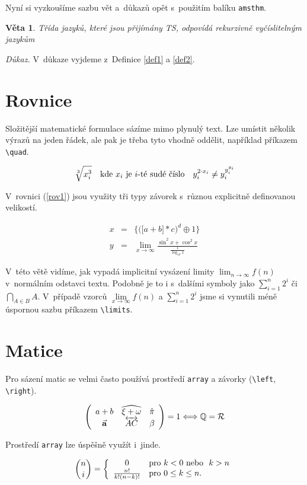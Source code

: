 \documentclass[a4paper,11pt,twocolumn]{article}
\newtheorem{veta}{Věta}
\begin{document}
Nyní si vyzkoušíme sazbu vět a~důkazů opět s~použitím
balíku \verb|amsthm|.

\begin{veta}
    Třída jazyků, které jsou přijímány TS, odpovídá rekurzivně vyčíslitelným jazykům
\end{veta}

\noindent\textit{Důkaz.}  V~důkaze vyjdeme z~Definice \ref{def1} a \ref{def2}.

\section{Rovnice}
Složitější matematické formulace sázíme mimo plynulý
text. Lze umístit několik výrazů na jeden řádek, ale pak je
třeba tyto vhodně oddělit, například příkazem \verb|\quad|.

$$\sqrt[3]{x^3_i} \quad \textnormal{kde}\ x_i\ \textnormal{je}\ i \textnormal{-té sudé číslo}\quad y^{2\cdot x_i}_i \neq y^{y^{y_i}_i}_i $$ 

V~rovnici (\ref{rov1}) jsou využity tři typy závorek s~různou explicitně definovanou velikostí.

\begin{eqnarray}
    x & = & \bigg\{ \Big( \big[a + b \big] * c  \Big) ^d \oplus 1 \bigg\} \label{rov1}\\ 
    y & = & \lim_{x\rightarrow\infty} \frac{ \sin^2x + \cos^2x}{\frac{1}{\log_{10} x}} \label{rov2} 
\end{eqnarray}

V~této větě vidíme, jak vypadá implicitní vysázení limity $\lim_{n\rightarrow\infty}f(n)$ v~normálním odstavci textu. Podobně je to i s~dalšími symboly jako $\sum_{i=1}^n 2^i$ či $\bigcap_{A \in B} A$. V~případě vzorců $\lim\limits_{x\rightarrow\infty} f(n)$ a $\sum\limits _{i=1}^n 2^i$ jsme si vynutili méně úspornou sazbu příkazem \verb|\limits|.

\section{Matice}
Pro sázení matic se velmi často používá prostředí \verb|array| a závorky (\verb|\left|, \verb|\right|).

$$
\left(
    \begin{array}{ccc}
        a + b & \widehat{\xi + \omega} & \hat{\pi}\\
        \vec{\textnormal{\textbf{a}}} & \overleftrightarrow{AC} & \beta  
    \end{array}
\right) = 1 \Longleftrightarrow \mathbb{Q} = \mathcal{R}
$$ 

\noindent Prostředí \verb|array| lze úspěšně využít i~jinde.

$$ 
\binom{n}{i} = 
\left\{
    \begin{array}{c l}
        0 & \text{pro } k < 0 \ \text{nebo } \ k > n \\
        \frac{n!}{k!(n - k)!} & \text{pro}\ 0 \leq k \leq n.
    \end{array}
\right.
$$
\end{document}
